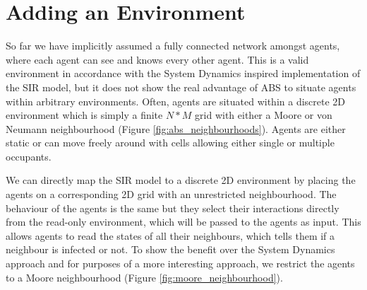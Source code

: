 \section{Adding an Environment}
\label{sec:adding_env}
So far we have implicitly assumed a fully connected network amongst agents, where each agent can see and knows every other agent. This is a valid environment in accordance with the System Dynamics inspired implementation of the SIR model, but it does not show the real advantage of ABS to situate agents within arbitrary environments. Often, agents are situated within a discrete 2D environment \cite{epstein_growing_1996} which is simply a finite $N*M$ grid with either a Moore or von Neumann neighbourhood (Figure \ref{fig:abs_neighbourhoods}). Agents are either static or can move freely around with cells allowing either single or multiple occupants.

We can directly map the SIR model to a discrete 2D environment by placing the agents on a corresponding 2D grid with an unrestricted neighbourhood. The behaviour of the agents is the same but they select their interactions directly from the read-only environment, which will be passed to the agents as input. This allows agents to read the states of all their neighbours, which tells them if a neighbour is infected or not. To show the benefit over the System Dynamics approach  and for purposes of a more interesting approach, we restrict the agents to a Moore neighbourhood (Figure \ref{fig:moore_neighbourhood}).

